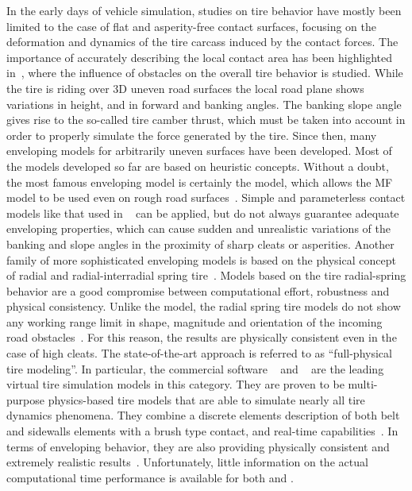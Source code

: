 In the early days of vehicle simulation, studies on tire behavior have mostly been limited to the case of flat and asperity-free contact surfaces, focusing on the deformation and dynamics of the tire carcass induced by the contact forces. The importance of accurately describing the local contact area has been highlighted in~\cite{kageyama2002study, pacejka2005spin}, where the influence of obstacles on the overall tire behavior is studied. While the tire is riding over 3D uneven road surfaces the local road plane shows variations in height, and in forward and banking angles. The banking slope angle gives rise to the so-called tire camber thrust, which must be taken into account in order to properly simulate the force generated by the tire. Since then, many enveloping models for arbitrarily uneven surfaces have been developed. Most of the models developed so far are based on heuristic concepts. Without a doubt, the most famous enveloping model is certainly the \Swift{} model, which allows the \ac{MF} model to be used even on rough road surfaces~\cite{schmeitz2004semiempirical}. Simple and parameterless contact models like that used in \TMEasy{}~\cite{rill2013tmeasy, rill2018sophisticated} can be applied, but do not always guarantee adequate enveloping properties,  which can cause sudden and unrealistic variations of the banking and slope angles in the proximity of sharp cleats or asperities. Another family of more sophisticated enveloping models is based on the physical concept of radial and radial-interradial spring tire~\cite{davis1975radial, badalamenti1988radial, negrut1994dynamic}. Models based on the tire radial-spring behavior are a good compromise between computational effort, robustness and physical consistency. Unlike the \Swift{} model, the radial spring tire models do not show any working range limit in shape, magnitude and orientation of the incoming road obstacles~\cite{davis1975radial}. For this reason, the results are physically consistent even in the case of high cleats. The state-of-the-art approach is referred to as ``full-physical tire modeling''. In particular, the commercial software \FTire{}~\cite{gipser2005ftire} and \CDTire{}~\cite{gallrein2007cdtire, gallrein2014advanced} are the leading virtual tire simulation models in this category. They are proven to be multi-purpose physics-based tire models that are able to simulate nearly all tire dynamics phenomena. They combine a discrete elements description of both belt and sidewalls elements with a brush type contact, and real-time capabilities~\cite{gipser2021ftire}. In terms of enveloping behavior, they are also providing physically consistent and extremely realistic results~\cite{gipser2008ftire, gallrein2007cdtire}. Unfortunately, little information on the actual computational time performance is available for both \FTire{} and \CDTire{}.

